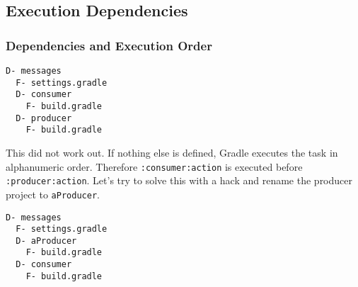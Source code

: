 \subsection{Execution Dependencies} %
\label{sub:execution_time_dependencies}

\subsubsection{Dependencies and Execution Order} %
\label{ssub:dependencies_and_execution_order}

\begin{minipage}[t]{7cm}
\begin{Verbatim}[frame=single,label=Project Tree]
D- messages
  F- settings.gradle
  D- consumer
    F- build.gradle
  D- producer
    F- build.gradle
\end{Verbatim}
\end{minipage}	
\begin{minipage}[t]{9cm}
\end{minipage}

This did not work out. If nothing else is defined, Gradle executes the task in alphanumeric order. Therefore \texttt{:consumer:action} is executed before \texttt{:producer:action}. Let's try to solve this with a hack and rename the producer project to \texttt{aProducer}.

\begin{minipage}[t]{7cm}
\begin{Verbatim}[frame=single,label=Project Tree]
D- messages
  F- settings.gradle
  D- aProducer
    F- build.gradle
  D- consumer
    F- build.gradle
\end{Verbatim}
\end{minipage}	

